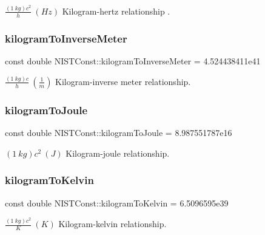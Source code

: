 $\frac{(1\ kg)c^2}{h} \ (Hz)$ Kilogram-\/hertz relationship . \mbox{\label{group___n_i_s_t_const-_kilogram_gaeb262618c1568d210f8a5a8fdca39ae2}} 
\subsubsection{\texorpdfstring{kilogram\+To\+Inverse\+Meter}{kilogramToInverseMeter}}
{\footnotesize\ttfamily const double N\+I\+S\+T\+Const\+::kilogram\+To\+Inverse\+Meter = 4.\+524438411e41}

$\frac{(1\ kg)c}{h} \ (\frac{1}{m})$ Kilogram-\/inverse meter relationship. \mbox{\label{group___n_i_s_t_const-_kilogram_gaf3635d5c9747ebcd2edadf77388fea9b}} 
\subsubsection{\texorpdfstring{kilogram\+To\+Joule}{kilogramToJoule}}
{\footnotesize\ttfamily const double N\+I\+S\+T\+Const\+::kilogram\+To\+Joule = 8.\+987551787e16}

$(1\ kg)c^2 \ (J)$ Kilogram-\/joule relationship. \mbox{\label{group___n_i_s_t_const-_kilogram_ga79d71b550888761f76eaca5ffc4a29cb}} 
\subsubsection{\texorpdfstring{kilogram\+To\+Kelvin}{kilogramToKelvin}}
{\footnotesize\ttfamily const double N\+I\+S\+T\+Const\+::kilogram\+To\+Kelvin = 6.\+5096595e39}

$\frac{(1\ kg)c^2}{K} \ (K)$ Kilogram-\/kelvin relationship. 